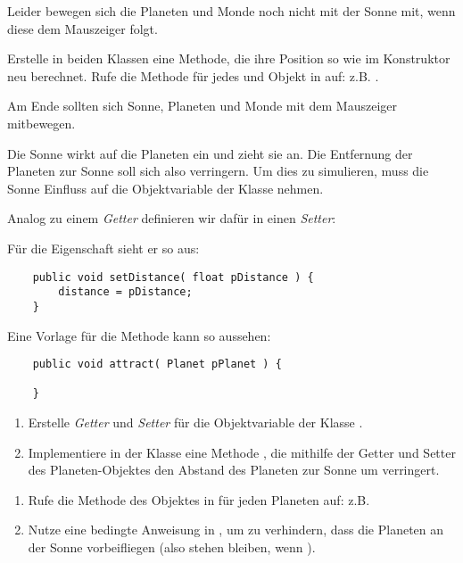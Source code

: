 \documentclass[10pt, a4paper]{arbeitsblatt}
\begin{document}
\begin{aufgabe}
Leider bewegen sich die Planeten und Monde noch nicht mit der Sonne mit, wenn diese dem Mauszeiger folgt.

Erstelle in beiden Klassen eine  Methode, die ihre Position so wie im Konstruktor neu berechnet. Rufe die Methode für jedes  und  Objekt in  auf: z.B. .

Am Ende sollten sich Sonne, Planeten und Monde mit dem Mauszeiger mitbewegen.
\end{aufgabe}

\begin{aufgabe}
Die Sonne wirkt auf die Planeten ein und zieht sie an. Die Entfernung der Planeten zur Sonne soll sich also verringern. Um dies zu simulieren, muss die Sonne Einfluss auf die Objektvariable  der Klasse  nehmen.

Analog zu einem \emph{Getter} definieren wir dafür in  einen \emph{Setter}:
\begin{multicols}{2}
	Für die Eigenschaft  sieht er so aus:
	\begin{verbatim}
	public void setDistance( float pDistance ) {
		distance = pDistance;
	}
	\end{verbatim}

	Eine Vorlage für die Methode  kann so aussehen:
	\begin{verbatim}
	public void attract( Planet pPlanet ) {

	}
	\end{verbatim}
\end{multicols}

\begin{enumerate}
	\item Erstelle \emph{Getter} und \emph{Setter} für die Objektvariable  der Klasse .
	\item Implementiere in der Klasse  eine Methode , die mithilfe der Getter und Setter des Planeten-Objektes  den Abstand des Planeten zur Sonne um  verringert.
\end{enumerate}


\begin{enumerate}[resume]
	\item Rufe die Methode  des  Objektes in  für jeden Planeten auf: z.B. 
	\item Nutze eine bedingte Anweisung in , um zu verhindern, dass die Planeten an der Sonne vorbeifliegen (also stehen bleiben, wenn ).
\end{enumerate}
\end{aufgabe}
\end{document}
